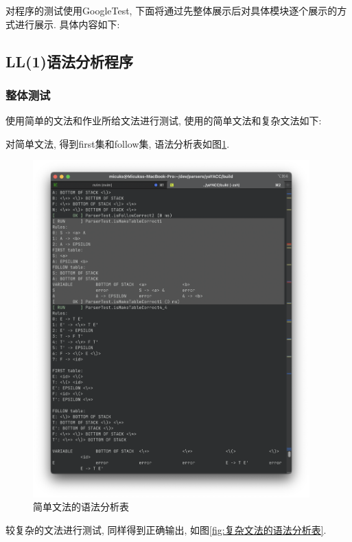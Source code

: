 对程序的测试使用GoogleTest,
下面将通过先整体展示后对具体模块逐个展示的方式进行展示. 具体内容如下:
\subsection{LL(1)语法分析程序}
\subsubsection{整体测试}
使用简单的文法和作业所给文法进行测试, 使用的简单文法和复杂文法如下:


对简单文法, 得到first集和follow集, 语法分析表如图\ref{fig:简单文法的语法分析表}.
\begin{figure}[ht!]
	\begin{center}
		\includegraphics[width=0.95\textwidth]{figures/ll1分析表1.png}
	\end{center}
	\caption{简单文法的语法分析表}
	\label{fig:简单文法的语法分析表}
\end{figure}

较复杂的文法进行测试, 同样得到正确输出, 如图\ref{fig:复杂文法的语法分析表}.


